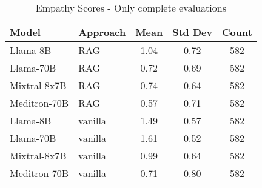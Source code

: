 \begin{table}[h]
\centering
\begin{tabular}{llccc}
\toprule
Model & Approach & Mean & Std Dev & Count \\
\midrule
Llama-8B & RAG & 1.04 & 0.72 & 582 \\
Llama-70B & RAG & 0.72 & 0.69 & 582 \\
Mixtral-8x7B & RAG & 0.74 & 0.64 & 582 \\
Meditron-70B & RAG & 0.57 & 0.71 & 582 \\
Llama-8B & vanilla & 1.49 & 0.57 & 582 \\
Llama-70B & vanilla & 1.61 & 0.52 & 582 \\
Mixtral-8x7B & vanilla & 0.99 & 0.64 & 582 \\
Meditron-70B & vanilla & 0.71 & 0.80 & 582 \\
\bottomrule
\end{tabular}
\caption{Empathy Scores - Only complete evaluations}
\label{tab:empathy_complete}
\end{table}